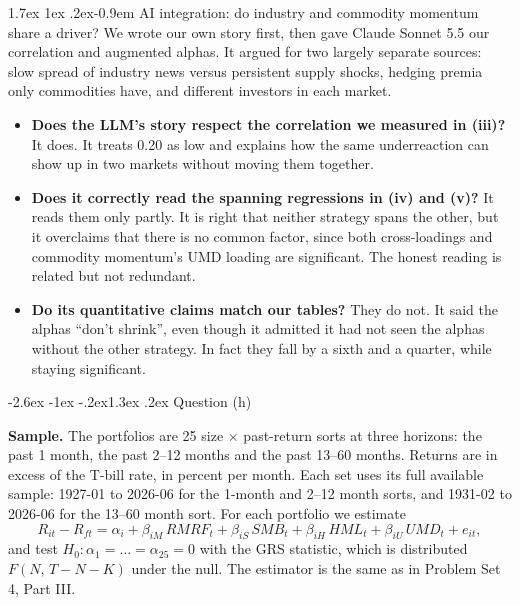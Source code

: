 \documentclass[11pt]{article}
\makeatletter
\renewcommand\section{\@startsection{section}{1}{0pt}%
  {-2.6ex \@plus -1ex \@minus -.2ex}{1.3ex \@plus .2ex}%
  {\normalfont\scshape\large\color{psink}}}   %
\renewcommand\paragraph{\@startsection{paragraph}{4}{0pt}%
  {1.7ex \@plus 1ex \@minus .2ex}{-0.9em}%
  {\normalfont\bfseries\normalsize\color{psink}}}
\makeatother
\begin{document}
\paragraph{AI integration: do industry and commodity momentum share a driver?} We wrote our own story first, then gave Claude Sonnet 5.5 our correlation and augmented alphas. It argued for two largely separate sources: slow spread of industry news versus persistent supply shocks, hedging premia only commodities have, and different investors in each market.

\begin{itemize}
\setlength{\itemsep}{4pt}\setlength{\parskip}{0pt}

\item[(i)] \textbf{Does the LLM's story respect the correlation we measured in (iii)?} It does. It treats 0.20 as low and explains how the same underreaction can show up in two markets without moving them together.

\item[(ii)] \textbf{Does it correctly read the spanning regressions in (iv) and (v)?} It reads them only partly. It is right that neither strategy spans the other, but it overclaims that there is no common factor, since both cross-loadings and commodity momentum's UMD loading are significant. The honest reading is related but not redundant.

\item[(iii)] \textbf{Do its quantitative claims match our tables?} They do not. It said the alphas ``don't shrink'', even though it admitted it had not seen the alphas without the other strategy. In fact they fall by a sixth and a quarter, while staying significant.

\end{itemize}

\section{Question (h)}

\textbf{Sample.} The portfolios are 25 size $\times$ past-return sorts at three horizons: the past 1 month, the past 2--12 months and the past 13--60 months. Returns are in excess of the T-bill rate, in percent per month. Each set uses its full available sample: 1927-01 to 2026-06 for the 1-month and 2--12 month sorts, and 1931-02 to 2026-06 for the 13--60 month sort. For each portfolio we estimate
\[
R_{it}-R_{ft}=\alpha_i+\beta_{iM}\,RMRF_t+\beta_{iS}\,SMB_t+\beta_{iH}\,HML_t+\beta_{iU}\,UMD_t+e_{it},
\]
and test $H_0:\alpha_1=\dots=\alpha_{25}=0$ with the GRS statistic, which is distributed $F(N,\,T-N-K)$ under the null. The estimator is the same as in Problem Set 4, Part III.
\end{document}
